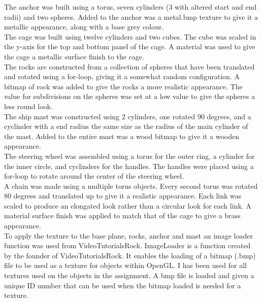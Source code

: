 \documentclass[]{article}
\begin{document}
\noindent
The anchor was built using a torus, seven cylinders (3 with altered start and end radii) and two spheres. Added to the anchor was a metal.bmp texture to give it a metallic appearance, along with a base grey colour. \\

\noindent
The cage was built using twelve cylinders and two cubes. The cube was scaled in the y-axis for the top and bottom panel of the cage. A material was used to give the cage a metallic surface finish to the cage. \\

\noindent
The rocks are constructed from a collection of spheres that have been translated and rotated using a for-loop, giving it a somewhat random configuration. A bitmap of rock was added to give the rocks a more realistic appearance. The value for subdivisions on the spheres was set at a low value to give the spheres a less round look.\\

\noindent
The ship mast was constructed using 2 cylinders, one rotated 90 degrees, and a cyclinder with a end radius the same size as the radius of the main cylinder of the mast. Added to the entire mast was a wood bitmap to give it a wooden appearance. \\

\noindent
The steering wheel was assembled using a torus for the outer ring, a cylinder for the inner circle, and cyclinders for the handles. The handles were placed using a for-loop to rotate around the center of the steering wheel. \\

\noindent
A chain was made using a multiple torus objects. Every second torus was rotated 80 degrees and translated up to give it a realistic appearance. Each link was scaled to produce an elongated look rather than a circular look for each link. A material surface finish was applied to match that of the cage to give a brass appearance. \\

\noindent
To apply the texture to the base plane, rocks, anchor and mast an image loader function was used from VideoTutorialsRock. ImageLoader is a function created by the founder of VideoTutorialsRock. It enables the loading of a bitmap (.bmp) file to be used as a texture for objects within OpenGL. I has been used for all textures used on the objects in the assignment. A bmp file is loaded and given a unique ID number that can be used when the bitmap loaded is needed for a texture. 
\end{document}
